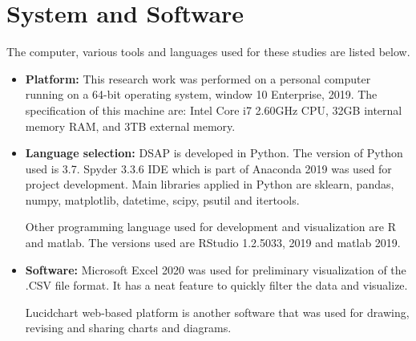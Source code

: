     






\section{System and Software}
The computer, various tools and languages used for these studies are listed below.

\begin{itemize}
    \item\textbf{Platform:} This research work was performed on a personal computer running on a 64-bit operating system, window 10 Enterprise, 2019. The specification of this machine are: Intel Core i7 2.60GHz CPU, 32GB internal memory RAM, and 3TB external memory. 
    \item\textbf{Language selection:} DSAP is developed in Python. The version of Python used is 3.7. Spyder 3.3.6 IDE which is part of Anaconda 2019 was used for project development. Main libraries applied in Python are sklearn, pandas, numpy, matplotlib, datetime, scipy, psutil and itertools.
    
    Other programming language used for development and visualization are R and matlab. The versions used are RStudio 1.2.5033, 2019 and matlab 2019. 
    
    \item\textbf{Software:} Microsoft Excel 2020 was used for preliminary visualization of the .CSV file format. It has a neat feature to quickly filter the data and visualize.
    
    Lucidchart web-based platform is another software that was used for drawing, revising and sharing charts and diagrams.
    

\end{itemize}


% 
